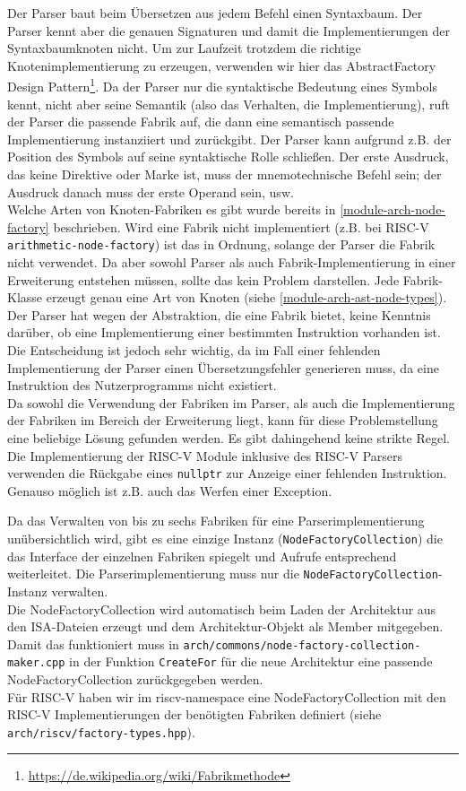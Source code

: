 Der Parser baut beim Übersetzen aus jedem Befehl einen Syntaxbaum. Der Parser
kennt aber die genauen Signaturen und damit die Implementierungen der
Syntaxbaumknoten nicht. Um zur Laufzeit trotzdem die richtige
Knotenimplementierung zu erzeugen, verwenden wir hier das
AbstractFactory Design Pattern\footnote{\url{https://de.wikipedia.org/wiki/Fabrikmethode}}. Da
der Parser nur die syntaktische Bedeutung eines Symbols kennt, nicht aber seine
Semantik (also das Verhalten, die Implementierung), ruft der Parser die passende
Fabrik auf, die dann eine semantisch passende Implementierung instanziiert und
zurückgibt. Der Parser kann aufgrund z.B. der Position des Symbols auf seine
syntaktische Rolle schließen. Der erste Ausdruck, das keine Direktive oder Marke
ist, muss der mnemotechnische Befehl sein; der Ausdruck danach muss der erste
Operand sein, usw. \\
Welche Arten von Knoten-Fabriken es gibt wurde bereits in
\autoref{module-arch-node-factory} beschrieben. Wird eine Fabrik nicht
implementiert (z.B. bei RISC-V \texttt{arithmetic-node-factory}) ist das in
Ordnung, solange der Parser die Fabrik nicht verwendet. Da aber sowohl Parser
als auch Fabrik-Implementierung in einer Erweiterung entstehen müssen, sollte
das kein Problem darstellen. Jede Fabrik-Klasse erzeugt genau eine Art von
Knoten (siehe \autoref{module-arch-ast-node-types}).\\

Der Parser hat wegen der Abstraktion, die eine Fabrik bietet, keine Kenntnis
darüber, ob eine Implementierung einer bestimmten Instruktion vorhanden ist. Die
Entscheidung ist jedoch sehr wichtig, da im Fall einer fehlenden Implementierung
der Parser einen Übersetzungsfehler generieren muss, da eine Instruktion des
Nutzerprogramms nicht existiert.\\
Da sowohl die Verwendung der Fabriken im Parser, als auch die Implementierung
der Fabriken im Bereich der Erweiterung liegt, kann für diese Problemstellung
eine beliebige Lösung gefunden werden. Es gibt dahingehend keine strikte
Regel.\\
Die Implementierung der RISC-V Module inklusive des RISC-V Parsers verwenden die
Rückgabe eines \texttt{nullptr} zur Anzeige einer fehlenden Instruktion. Genauso
möglich ist z.B. auch das Werfen einer Exception.

Da das Verwalten von bis zu sechs Fabriken für eine Parserimplementierung
unübersichtlich wird, gibt es eine einzige Instanz
(\texttt{NodeFactoryCollection}) die das Interface der einzelnen Fabriken
spiegelt und Aufrufe entsprechend weiterleitet. Die Parserimplementierung muss
nur die \texttt{NodeFactoryCollection}-Instanz verwalten.\\
Die NodeFactoryCollection wird automatisch beim Laden der Architektur aus den
ISA-Dateien erzeugt und dem Architektur-Objekt als Member mitgegeben. Damit das
funktioniert muss in \texttt{arch/commons/node-factory-collection-maker.cpp} in
der Funktion \texttt{CreateFor} für die neue Architektur eine passende
NodeFactoryCollection zurückgegeben werden.\\
Für RISC-V haben wir im riscv-namespace eine NodeFactoryCollection mit den
RISC-V Implementierungen der benötigten Fabriken definiert (siehe
\texttt{arch/riscv/factory-types.hpp}).

